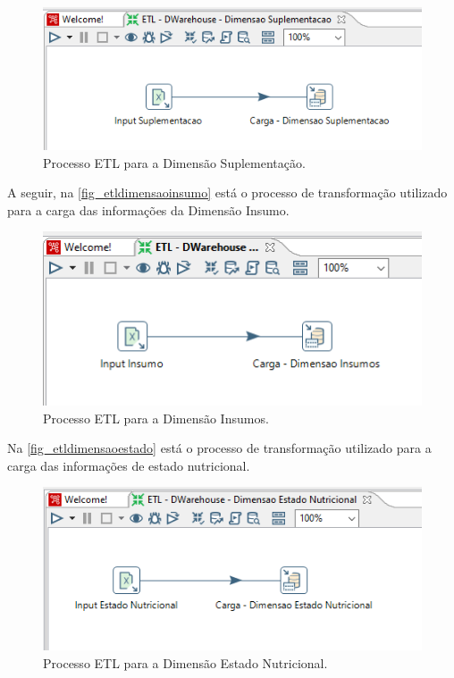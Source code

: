 \begin{figure}[htb]
	\caption{\label{fig_etldimensaosuplementacao}Processo ETL para a Dimensão Suplementação.}
	\begin{center}
	    \includegraphics[scale=0.8]{Imagens/figura - etl dw suplementacao.png}
	\end{center}
\end{figure}

\newpage
A seguir, na \autoref{fig_etldimensaoinsumo} está o processo de transformação utilizado para a carga das informações da Dimensão Insumo.

\begin{figure}[htb]
	\caption{\label{fig_etldimensaoinsumo}Processo ETL para a Dimensão Insumos.}
	\begin{center}
	    \includegraphics[scale=0.7]{Imagens/figura - etl dw insumos.png}
	\end{center}
\end{figure}

Na \autoref{fig_etldimensaoestado} está o processo de transformação utilizado para a carga das informações de estado nutricional.

\begin{figure}[htb]
	\caption{\label{fig_etldimensaoestado}Processo ETL para a Dimensão Estado Nutricional.}
	\begin{center}
	    \includegraphics[scale=0.7]{Imagens/figura - etl dw estadonutricional.png}
	\end{center}
\end{figure}

